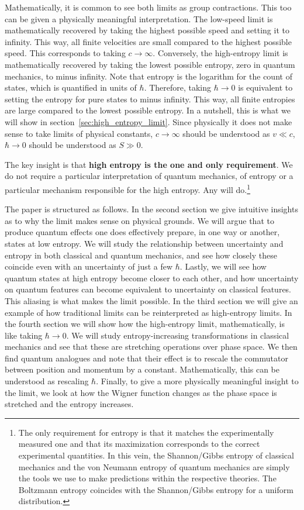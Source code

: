 \documentclass{article}
\begin{document}
Mathematically, it is common to see both limits as group contractions. This too can be given a physically meaningful interpretation. The low-speed limit is mathematically recovered by taking the highest possible speed and setting it to infinity. This way, all finite velocities are small compared to the highest possible speed. This corresponds to taking $c \to \infty$. Conversely, the high-entropy limit is mathematically recovered by taking the lowest possible entropy, zero in quantum mechanics, to minus infinity. Note that entropy is the logarithm for the count of states, which is quantified in units of $\hbar$. Therefore, taking $\hbar \to 0$ is equivalent to setting the entropy for pure states to minus infinity. This way, all finite entropies are large compared to the lowest possible entropy. In a nutshell, this is what we will show in section~\ref{sec:high_entropy_limit}. Since physically it does not make sense to take limits of physical constants, $c \to \infty$ should be understood as $v \ll c$, $\hbar \to 0$ should be understood as $S \gg 0$.

The key insight is that \textbf{high entropy is the one and only requirement}. We do not require a particular interpretation of quantum mechanics, of entropy or a particular mechanism responsible for the high entropy. Any will do.\footnote{The only requirement for entropy is that it matches the experimentally measured one and that its maximization corresponds to the correct experimental quantities. In this vein, the Shannon/Gibbs entropy of classical mechanics and the von Neumann entropy of quantum mechanics are simply the tools we use to make predictions within the respective theories. The Boltzmann entropy coincides with the Shannon/Gibbs entropy for a uniform distribution. }

The paper is structured as follows. In the second section we give intuitive insights as to why the limit makes sense on physical grounds. We will argue that to produce quantum effects one does effectively prepare, in one way or another, states at low entropy. We will study the relationship between uncertainty and entropy in both classical and quantum mechanics, and see how closely these coincide even with an uncertainty of just a few $\hbar$. Lastly, we will see how quantum states at high entropy become closer to each other, and how uncertainty on quantum features can become equivalent to uncertainty on classical features. This aliasing is what makes the limit possible. In the third section we will give an example of how traditional limits can be reinterpreted as high-entropy limits. In the fourth section we will show how the high-entropy limit, mathematically, is like taking $\hbar \to 0$. We will study entropy-increasing transformations in classical mechanics and see that these are stretching operations over phase space. We then find quantum analogues and note that their effect is to rescale the commutator between position and momentum by a constant. Mathematically, this can be understood as rescaling $\hbar$. Finally, to give a more physically meaningful insight to the limit, we look at how the Wigner function changes as the phase space is stretched and the entropy increases.
\end{document}
